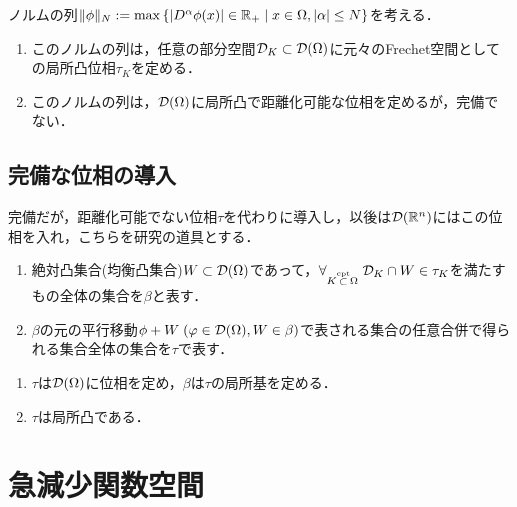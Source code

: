 \documentclass[uplatex,dvipdfmx]{jsreport}
\begin{document}
\begin{lemma}
    ノルムの列$\|\phi\|_N:=\max\left\{\lvert D^\alpha\phi(x)\rvert\in\mathbb{R}_+\mid x\in\Omega,\lvert\alpha\rvert\le N\right\}$を考える．
    \begin{enumerate}
        \item このノルムの列は，任意の部分空間$\mathcal{D}_K\subset\mathcal{D}(\Omega)$に元々のFrechet空間としての局所凸位相$\tau_K$を定める．
        \item このノルムの列は，$\mathcal{D}(\Omega)$に局所凸で距離化可能な位相を定めるが，完備でない．
    \end{enumerate}
\end{lemma}

\subsection{完備な位相の導入}

\begin{tcolorbox}[colframe=ForestGreen, colback=ForestGreen!10!white,breakable,colbacktitle=ForestGreen!40!white,coltitle=black,fonttitle=\bfseries\sffamily,
title=]
    完備だが，距離化可能でない位相$\tau$を代わりに導入し，以後は$\mathcal{D}(\mathbb{R}^n)$にはこの位相を入れ，こちらを研究の道具とする．
\end{tcolorbox}

\begin{definition}\mbox{}
    \begin{enumerate}
        \item 絶対凸集合(均衡凸集合)$W\subset\mathcal{D}(\Omega)$であって，$\forall_{K\overset{\textrm{cpt}}{\subset}\Omega}\;\mathcal{D}_K\cap W\in\tau_K$を満たすもの全体の集合を$\beta$と表す．
        \item $\beta$の元の平行移動$\phi+W\;(\varphi\in\mathcal{D}(\Omega),W\in\beta)$で表される集合の任意合併で得られる集合全体の集合を$\tau$で表す．
    \end{enumerate}
\end{definition}

\begin{theorem}\mbox{}\label{thm-topology-on-the-space-of-test-functions}
    \begin{enumerate}
        \item $\tau$は$\mathcal{D}(\Omega)$に位相を定め，$\beta$は$\tau$の局所基を定める．
        \item $\tau$は局所凸である．
    \end{enumerate}
\end{theorem}

\section{急減少関数空間}
\end{document}
